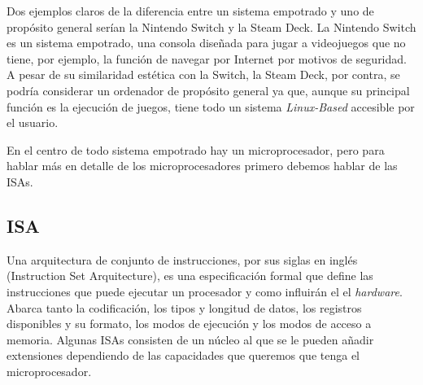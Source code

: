 Dos ejemplos claros de la diferencia entre un sistema empotrado y uno de propósito general serían la Nintendo Switch y la Steam Deck. La Nintendo Switch es un sistema empotrado, una consola diseñada para jugar a videojuegos que no tiene, por ejemplo, la función de navegar por Internet por motivos de seguridad. 
A pesar de su similaridad estética con la Switch, la Steam Deck, por contra, se podría considerar un ordenador de propósito general ya que, aunque su principal función es la ejecución de juegos, tiene todo un sistema \textit{Linux-Based} accesible por el usuario.



%
%
%
%
%


En el centro de todo sistema empotrado hay un microprocesador, pero para hablar más en detalle de los microprocesadores primero debemos hablar de las ISAs.

\subsection{ISA}
Una arquitectura de conjunto de instrucciones,  por sus siglas en inglés (Instruction Set Arquitecture), es una especificación formal que define las instrucciones que puede ejecutar un procesador y como influirán el el \emph{hardware}. Abarca tanto la codificación, los tipos y longitud de datos, los registros disponibles y su formato, los modos de ejecución y los modos de acceso a memoria. Algunas ISAs consisten de un núcleo al que se le pueden añadir extensiones dependiendo de las capacidades que queremos que tenga el microprocesador.\\

